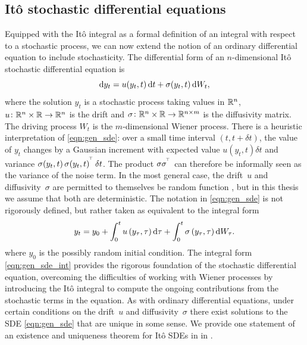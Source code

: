 \subsection{It\^o stochastic differential equations}\label{sec:bkg_sde}
Equipped with the It\^o integral as a formal definition of an integral with respect to a stochastic process, we can now extend the notion of an ordinary differential equation to include stochasticity.
The differential form of an \(n\)-dimensional It\^o stochastic differential equation is
\begin{equation}
	\dif y_t = u\!\left(y_t, t\right)\dif t + \sigma\!\left(y_t, t\right)\dif W_t,
	\label{eqn:gen_sde}
\end{equation}
where the solution \(y_t\) is a stochastic process taking values in \(\mathbb{R}^n\), \(u\colon \mathbb{R}^n \times \mathbb{R} \to \mathbb{R}^n\) is the drift and \(\sigma\colon \mathbb{R}^n \times \mathbb{R} \to \mathbb{R}^{n\times m}\) is the diffusivity matrix.
The driving process \(W_t\) is the \(m\)-dimensional Wiener process.
There is a heuristic interpretation of \cref{eqn:gen_sde}: over a small time interval \(\left(t, t + \delta t\right)\), the value of \(y_t\) changes by a Gaussian increment with expected value \(u\!\left(y_t, t\right)\delta t\) and variance \(\sigma\!\left(y_t, t\right)\sigma\!\left(y_t, t\right)^{^{\!\top}}\delta t\).
The product \(\sigma\sigma^{^{\!\top}}\) can therefore be informally seen as the variance of the noise term.
In the most general case, the drift~\(u\) and diffusivity~\(\sigma\) are permitted to themselves be random function \citep{KallianpurSundar_2014_StochasticAnalysisDiffusion}, but in this thesis we assume that both are deterministic.
The notation in \cref{eqn:gen_sde} is not rigorously defined, but rather taken as equivalent to the integral form
\begin{equation}\label{eqn:gen_sde_int}
	y_t = y_0 + \int_0^t{u\left(y_\tau, \tau\right)\dif\tau} + \int_0^t{\sigma\left(y_\tau, \tau\right)\dif W_\tau}.
\end{equation}
where \(y_0\) is the possibly random initial condition.
The integral form \cref{eqn:gen_sde_int} provides the rigorous foundation of the stochastic differential equation, overcoming the difficulties of working with Wiener processes by introducing the It\^o integral to compute the ongoing contributions from the stochastic terms in the equation.
As with ordinary differential equations, under certain conditions on the drift~\(u\) and diffusivity~\(\sigma\) there exist solutions to the SDE \cref{eqn:gen_sde} that are unique in some sense.
We provide one statement of an existence and uniqueness theorem for It\^o SDEs in  in .

